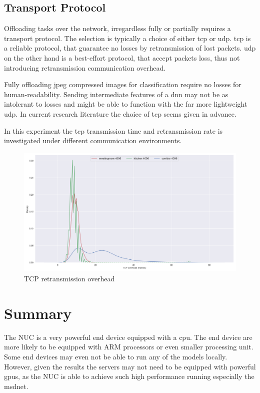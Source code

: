 \subsection{Transport Protocol} 

Offloading tasks over the network, irregardless fully or partially requires a transport protocol. The selection is typically a choice of either \gls{tcp} or \gls{udp}. \gls{tcp} is a reliable protocol, that guarantee no losses by retransmission of lost packets. \gls{udp} on the other hand is a best-effort protocol, that accept packets loss, thus not introducing retransmission communication overhead. 

Fully offloading \gls{jpeg} compressed images for classification require no losses for human-readability. Sending intermediate features of a \gls{dnn} may not be as intolerant to losses and might be able to function with the far more lightweight \gls{udp}. In current research literature the choice of \gls{tcp} seems given in advance.  

In this experiment the \gls{tcp} transmission time and retransmission rate is investigated under different communication environments. 

\begin{figure}
	\centering
	\includegraphics[width=\linewidth]{figures/tcp/tcpoverhead}
	\caption[TCP retransmission overhead]{TCP retransmission overhead}
\end{figure}

\section{Summary}

The NUC is a very powerful end device equipped with a \gls{cpu}. The end device are more likely to be equipped with ARM processors or even smaller processing unit. Some end devices may even not be able to run any of the models locally. However, given the results the servers may not need to be equipped with powerful \gls{gpu}s, as the NUC is able to achieve such high performance running especially the \gls{msdnet}. 

